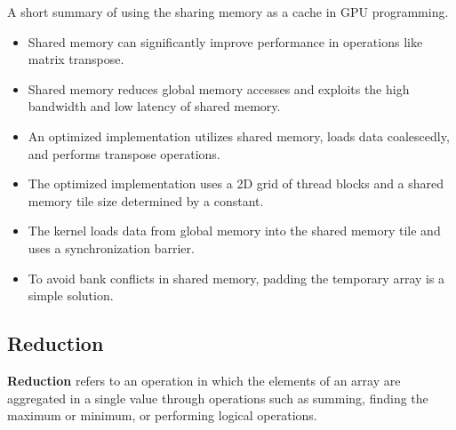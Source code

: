 \par
A short summary of using the sharing memory as a cache in GPU programming.
\begin{itemize}
    \item Shared memory can significantly improve performance in operations like matrix transpose.
    \item Shared memory reduces global memory accesses and exploits the high bandwidth and low latency of shared memory.
    \item An optimized implementation utilizes shared memory, loads data coalescedly, and performs transpose operations.
    \item The optimized implementation uses a 2D grid of thread blocks and a shared memory tile size determined by a constant.
    \item The kernel loads data from global memory into the shared memory tile and uses a synchronization barrier.
    \item To avoid bank conflicts in shared memory, padding the temporary array is a simple solution.
\end{itemize}




\subsection{Reduction}


\par
\textbf{Reduction} refers to an operation in which the elements of an array are aggregated in a single value through operations such as summing, finding the maximum or minimum, or performing logical operations.


